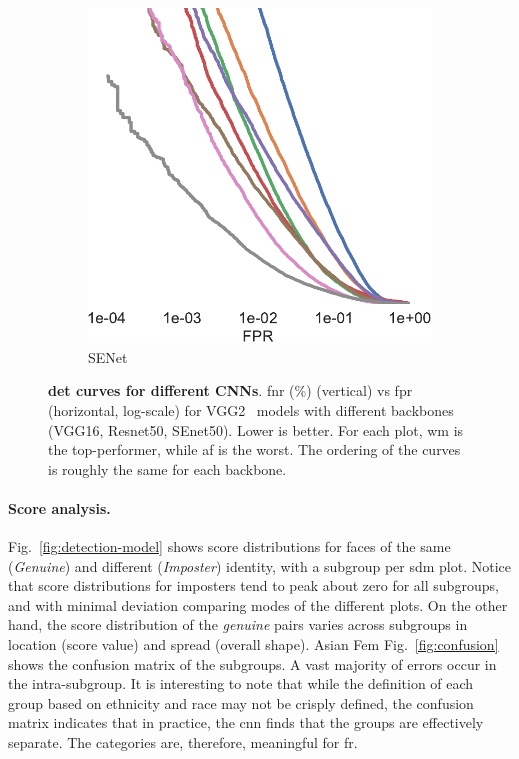 \begin{figure}[h!]
\begin{subfigure}[t]{.27\linewidth}
    \includegraphics[width=.75\linewidth]{figures/curve_senet50_subgroups-crop.pdf}
    \caption{SENet~\cite{hu2018squeeze}}
    \end{subfigure}
    \caption{\small{\textbf{\gls{det} curves for different CNNs}. \gls{fnr} (\%) (vertical) vs \gls{fpr}  (horizontal, log-scale) for VGG2~\cite{Cao18} models with different backbones (VGG16, Resnet50, SEnet50). Lower is better. For each plot, \gls{wm} is the top-performer, while \gls{af} is the worst. The ordering of the curves is roughly the same for each backbone.}}\label{fig:sdm-appendix-a}
\end{figure}
\noindent\paragraph{Score analysis.}
Fig.~\ref{fig:detection-model} shows score distributions for faces of the same (\ie \emph{Genuine}) and different (\ie \emph{Imposter}) identity, with a subgroup per \gls{sdm} plot. Notice that score distributions for imposters tend to peak about zero for all subgroups, and with minimal deviation comparing modes of the different plots. On the other hand, the score distribution of the \emph{genuine} pairs varies across subgroups in location (\ie score value) and spread (\ie overall shape). Asian Fem
Fig.~\ref{fig:confusion} shows the confusion matrix of the subgroups. A vast majority of errors occur in the intra-subgroup. It is interesting to note that while the definition of  each group  based on ethnicity and race may not be crisply defined, the confusion matrix indicates that in practice, the \gls{cnn} finds that the groups are effectively separate. The categories are, therefore, meaningful for \gls{fr}.








